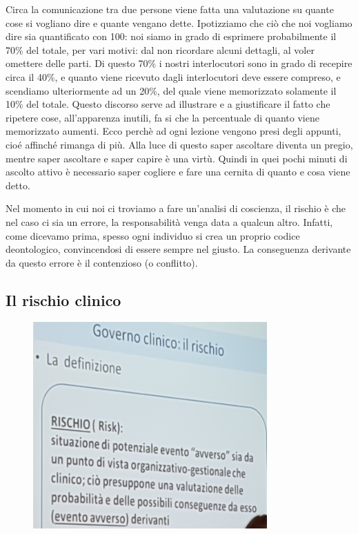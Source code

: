 Circa la comunicazione tra due persone viene fatta una valutazione su
quante cose si vogliano dire e quante vengano dette. Ipotizziamo che ciò
che noi vogliamo dire sia quantificato con 100: noi siamo in grado di
esprimere probabilmente il 70\% del totale, per vari motivi: dal non
ricordare alcuni dettagli, al voler omettere delle parti. Di questo 70\%
i nostri interlocutori sono in grado di recepire circa il 40\%, e quanto
viene ricevuto dagli interlocutori deve essere compreso, e scendiamo
ulteriormente ad un 20\%, del quale viene memorizzato solamente il 10\%
del totale. Questo discorso serve ad illustrare e a giustificare il
fatto che ripetere cose, all'apparenza inutili, fa si che la percentuale
di quanto viene memorizzato aumenti. Ecco perchè ad ogni lezione vengono
presi degli appunti, cioé affinché rimanga di più. Alla luce di questo
saper ascoltare diventa un pregio, mentre saper ascoltare e saper capire
è una virtù. Quindi in quei pochi minuti di ascolto attivo è necessario
saper cogliere e fare una cernita di quanto e cosa viene detto.

Nel momento in cui noi ci troviamo a fare un'analisi di coscienza, il
rischio è che nel caso ci sia un errore, la responsabilità venga data a
qualcun altro. Infatti, come dicevamo prima, spesso ogni individuo si
crea un proprio codice deontologico, convincendosi di essere sempre nel
giusto. La conseguenza derivante da questo errore è il contenzioso (o
conflitto).

\subsection{Il rischio clinico}

\begin{figure}[!ht]
\centering
	\includegraphics[width=0.8\textwidth]{29/image8.jpeg}
	\end{figure}

